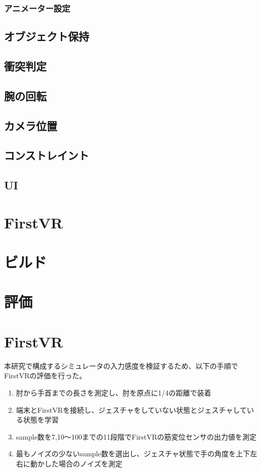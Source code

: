 \documentclass{ltjsreport}
\begin{document}
			\subsubsection{アニメーター設定}
		\subsection{オブジェクト保持}
		\subsection{衝突判定}
		\subsection{腕の回転}
		\subsection{カメラ位置}
		\subsection{コンストレイント}
		\subsection{UI}
		

	\section{FirstVR}
		
	\section{ビルド}
	\section{評価}
		\section{FirstVR}
			本研究で構成するシミュレータの入力感度を検証するため、以下の手順でFirstVRの評価を行った。
			\begin{enumerate}
				\item 肘から手首までの長さを測定し、肘を原点に1/4の距離で装着
				\item 端末とFirstVRを接続し、ジェスチャをしていない状態とジェスチャしている状態を学習
				\item sample数を7,10〜100までの11段階でFirstVRの筋変位センサの出力値を測定
				\item 最もノイズの少ないsample数を選出し、ジェスチャ状態で手の角度を上下左右に動かした場合のノイズを測定
			\end{enumerate}
\end{document}
